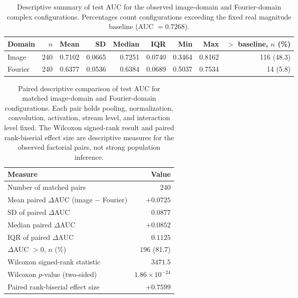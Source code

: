 
\begin{table}[t]
\centering
\small
\setlength{\tabcolsep}{3pt}
\caption{Descriptive summary of test AUC for the observed image-domain and Fourier-domain complex configurations. Percentages count configurations exceeding the fixed real magnitude baseline (AUC $=0.7268$).}
\label{tab:results_auc_landscape_summary}
\begin{tabular}{lrrrrrrrr}
\toprule
Domain & $n$ & Mean & SD & Median & IQR & Min & Max & $>$ baseline, $n$ (\%) \\
\midrule
Image   & 240 & 0.7102 & 0.0665 & 0.7251 & 0.0740 & 0.3464 & 0.8162 & 116 (48.3) \\
Fourier & 240 & 0.6377 & 0.0536 & 0.6384 & 0.0689 & 0.5037 & 0.7534 & 14  (5.8) \\
\bottomrule
\end{tabular}
\end{table}

\begin{table}[t]
\centering
\small
\setlength{\tabcolsep}{5pt}
\caption{Paired descriptive comparison of test AUC for matched image-domain and Fourier-domain configurations. Each pair holds pooling, normalization, convolution, activation, stream level, and interaction level fixed. The Wilcoxon signed-rank result and paired rank-biserial effect size are descriptive measures for the observed factorial pairs, not strong population inference.}
\label{tab:results_auc_landscape_separation}
\begin{tabular}{lr}
\toprule
Measure & Value \\
\midrule
Number of matched pairs & $240$ \\
Mean paired $\Delta$AUC (image $-$ Fourier) & $+0.0725$ \\
SD of paired $\Delta$AUC & $0.0877$ \\
Median paired $\Delta$AUC & $+0.0852$ \\
IQR of paired $\Delta$AUC & $0.1125$ \\
$\Delta$AUC $>0$, $n$ (\%) & $196$ (81.7) \\
Wilcoxon signed-rank statistic & $3471.5$ \\
Wilcoxon $p$-value (two-sided) & $1.86\times10^{-24}$ \\
Paired rank-biserial effect size & $+0.7599$ \\
\bottomrule
\end{tabular}
\end{table}
